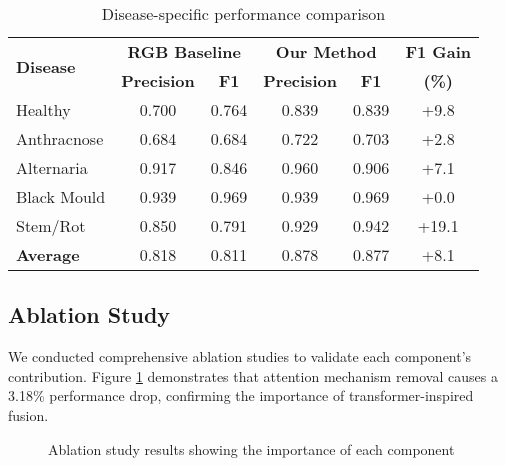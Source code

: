 \documentclass[conference]{IEEEtran}
\begin{document}
\begin{table}[htbp]
    \caption{Disease-specific performance comparison}
    \label{tab:perclass}
    \centering
    \footnotesize
    \begin{tabular}{|l|c|c|c|c|c|}
        \hline
        \multirow{2}{*}{\textbf{Disease}} & \multicolumn{2}{c|}{\textbf{RGB Baseline}} & \multicolumn{2}{c|}{\textbf{Our Method}} & \textbf{F1 Gain} \\
        \cline{2-5}
         & \textbf{Precision} & \textbf{F1} & \textbf{Precision} & \textbf{F1} & \textbf{(\%)} \\
        \hline
        Healthy & 0.700 & 0.764 & 0.839 & 0.839 & +9.8 \\
        Anthracnose & 0.684 & 0.684 & 0.722 & 0.703 & +2.8 \\
        Alternaria & 0.917 & 0.846 & 0.960 & 0.906 & +7.1 \\
        Black Mould & 0.939 & 0.969 & 0.939 & 0.969 & +0.0 \\
        Stem/Rot & 0.850 & 0.791 & 0.929 & 0.942 & +19.1 \\
        \hline
        \textbf{Average} & 0.818 & 0.811 & 0.878 & 0.877 & +8.1 \\
        \hline
    \end{tabular}
\end{table}

\subsection{Ablation Study}

We conducted comprehensive ablation studies to validate each component's contribution. Figure \ref{fig:ablation} demonstrates that attention mechanism removal causes a 3.18\% performance drop, confirming the importance of transformer-inspired fusion.

\begin{figure}[htbp]
    \centering
    \caption{Ablation study results showing the importance of each component}
    \label{fig:ablation}
\end{figure}
\end{document}
